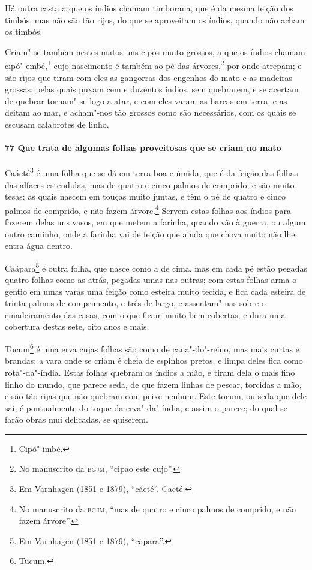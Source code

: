\begin{linenumbers}
Há outra casta a que os índios chamam timborana, que é da mesma feição dos timbós, mas não
são tão rijos, do que se aproveitam os índios, quando não acham os timbós.

Criam"-se também nestes matos uns cipós muito grossos, a que os índios chamam
cipó"-embé,\footnote{ Cipó"-imbé.} cujo nascimento é também ao pé das árvores,\footnote{ No
manuscrito da \textsc{bgjm}, ``cipao este cujo''.} por onde atrepam; e são rijos que tiram
com eles as gangorras dos engenhos do mato e as madeiras grossas; pelas quais puxam cem e
duzentos índios, sem quebrarem, e se acertam de quebrar tornam"-se logo a atar, e com eles
varam as barcas em terra, e as deitam ao mar, e acham"-nos tão grossos como são
necessários, com os quais se escusam calabrotes de linho.

\paragraph{77 Que trata de algumas folhas proveitosas que se criam no mato}\quad
Caáeté\footnote{ Em Varnhagen (1851 e 1879), ``cáeté''. Caeté.} é uma folha que se dá em
terra boa e úmida, que é da feição das folhas das alfaces estendidas, mas de quatro e
cinco palmos de comprido, e são muito tesas; as quais nascem em touças muito juntas, e têm
o pé de quatro e cinco palmos de comprido, e não fazem árvore.\footnote{ No manuscrito da
\textsc{bgjm}, ``mas de quatro e cinco palmos de comprido, e não fazem árvore''.} Servem
estas folhas aos índios para fazerem delas uns vasos, em que metem a farinha, quando vão à
guerra, ou algum outro caminho, onde a farinha vai de feição que ainda que chova muito não
lhe entra água dentro.

Caápara\footnote{ Em Varnhagen (1851 e 1879), ``capara''.} é outra folha, que nasce como a
de cima, mas em cada pé estão pegadas quatro folhas como as atrás, pegadas umas nas
outras; com estas folhas arma o gentio em umas varas uma feição como esteira muito tecida,
e fica cada esteira de trinta palmos de comprimento, e três de largo, e assentam"-nas sobre
o emadeiramento das casas, com o que ficam muito bem cobertas; e dura uma cobertura destas
sete, oito anos e mais.

Tocum\footnote{ Tucum.} é uma erva cujas folhas são como de cana"-do"-reino, mas mais curtas
e brandas; a vara onde se criam é cheia de espinhos pretos, e limpa deles fica como
rota"-da"-índia. Estas folhas quebram os índios a mão, e tiram dela o mais fino linho do
mundo, que parece seda, de que fazem linhas de pescar, torcidas a mão, e são tão rijas que
não quebram com peixe nenhum. Este tocum, ou seda que dele sai, é pontualmente do toque da
erva"-da"-índia, e assim o parece; do qual se farão obras mui delicadas, se quiserem.


\end{linenumbers}
